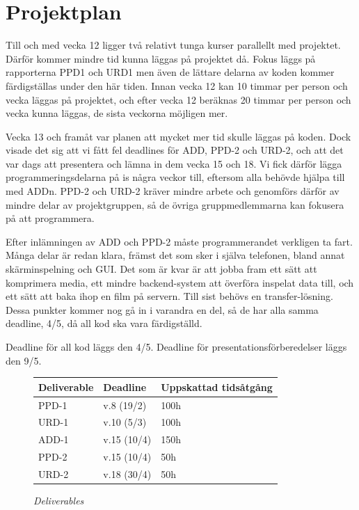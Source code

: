 
\section{Projektplan}
\label{sec:projektplan}
Till och med vecka 12 ligger två relativt tunga kurser parallellt med projektet. Därför kommer mindre tid kunna läggas på projektet då. Fokus läggs på rapporterna PPD1 och URD1 men även de lättare delarna av koden kommer färdigställas under den här tiden. Innan vecka 12 kan 10 timmar per person och vecka läggas på projektet, och efter vecka 12 beräknas 20 timmar per person och vecka kunna läggas, de sista veckorna möjligen mer.

Vecka 13 och framåt var planen att mycket mer tid skulle läggas på koden. Dock visade det sig att vi fått fel deadlines för ADD, PPD-2 och URD-2, och att det var dags att presentera och lämna in dem vecka 15 och 18. Vi fick därför lägga programmeringsdelarna på is några veckor till, eftersom alla behövde hjälpa till med ADDn. PPD-2 och URD-2 kräver mindre arbete och genomförs därför av mindre delar av projektgruppen, så de övriga gruppmedlemmarna kan fokusera på att programmera.

Efter inlämningen av ADD och PPD-2 måste programmerandet verkligen ta fart. Många delar är redan klara, främst det som sker i själva telefonen, bland annat skärminspelning och GUI. Det som är kvar är att jobba fram ett sätt att komprimera media, ett mindre backend-system att överföra inspelat data till, och ett sätt att baka ihop en film på servern. Till sist behövs en transfer-lösning. Dessa punkter kommer nog gå in i varandra en del, så de har alla samma deadline, 4/5, då all kod ska vara färdigställd. 

Deadline för all kod läggs den 4/5. Deadline för presentationsförberedelser läggs den 9/5. 

\begin{figure}[H]
\centering
\begin{tabular}{ | l | l | l |}
  \hline
  \textbf{Deliverable} & \textbf{Deadline} & \textbf{Uppskattad tidsåtgång} \\ \hline
  PPD-1 & v.8 (19/2) & 100h \\ \hline
  URD-1 & v.10 (5/3) & 100h \\ \hline
  ADD-1 & v.15 (10/4) & 150h \\ \hline
  PPD-2 & v.15 (10/4) & 50h \\ \hline
  URD-2 & v.18 (30/4) & 50h \\ \hline
\end{tabular}
\caption*{\textit{Deliverables}}
\end{figure}

